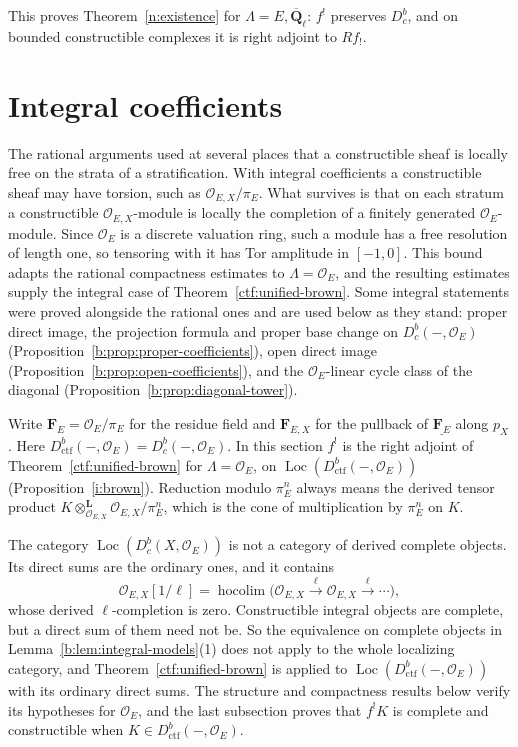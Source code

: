 \documentclass[11pt,a4paper]{article}
\numberwithin{equation}{section}
\theoremstyle{definition}
\theoremstyle{remark}
\newcommand{\Dbc}{D^b_c}
\newcommand{\Loc}{\operatorname{Loc}}
\newcommand{\Qbar}{\overline{\mathbf Q}_\ell}
\newcommand{\Dctf}{D^b_{\mathrm{ctf}}}
\begin{document}
This proves Theorem~\ref{n:existence} for $\Lambda=E,\Qbar$: $f^!$
preserves $\Dbc$, and on bounded constructible complexes it is right
adjoint to $Rf_!$.

\section{Integral coefficients}
\label{i:heart}
The rational arguments used at several places that a constructible sheaf
is locally free on the strata of a stratification. With integral
coefficients a constructible sheaf may have torsion, such as
$\mathcal O_{E,X}/\pi_E$. What survives is that on each stratum a
constructible $\mathcal O_{E,X}$-module is locally the completion of a
finitely generated $\mathcal O_E$-module. Since $\mathcal O_E$ is a
discrete valuation ring, such a module has a free resolution of length
one, so tensoring with it has Tor amplitude in $[-1,0]$. This bound
adapts the rational compactness estimates to $\Lambda=\mathcal O_E$,
and the resulting estimates supply the integral case of
Theorem~\ref{ctf:unified-brown}. Some integral statements were proved
alongside the rational ones and are used below as they stand: proper direct image,
the projection formula and proper base change on $\Dbc(-,\mathcal O_E)$
(Proposition~\ref{b:prop:proper-coefficients}), open direct image
(Proposition~\ref{b:prop:open-coefficients}), and the $\mathcal O_E$-linear
cycle class of the diagonal (Proposition~\ref{b:prop:diagonal-tower}).

Write $\mathbf F_E=\mathcal O_E/\pi_E$ for the residue field and
$\mathbf F_{E,X}$ for the pullback of $\underline{\mathbf F_E}$ along
$p_X$. Here
$\Dctf(-,\mathcal O_E)=\Dbc(-,\mathcal O_E)$.
In this section $f^!$ is the right adjoint of
Theorem~\ref{ctf:unified-brown} for $\Lambda=\mathcal O_E$, on
$\Loc(\Dctf(-,\mathcal O_E))$ (Proposition~\ref{i:brown}). Reduction
modulo $\pi_E^n$ always means the derived tensor product
$K\otimes^{\mathbf L}_{\mathcal O_{E,X}}\mathcal O_{E,X}/\pi_E^n$, which is
the cone of multiplication by $\pi_E^n$ on $K$.

The category $\Loc(\Dbc(X,\mathcal O_E))$ is not a category of derived
complete objects. Its direct sums are the ordinary ones, and it contains
\[
 \mathcal O_{E,X}[1/\ell]
 =\operatorname{hocolim}\bigl(\mathcal O_{E,X}
   \xrightarrow{\ell}\mathcal O_{E,X}
   \xrightarrow{\ell}\cdots\bigr),
\]
whose derived $\ell$-completion is zero. Constructible integral objects
are complete, but a direct sum of them need not be. So the equivalence
on complete objects in Lemma~\ref{b:lem:integral-models}(1) does not
apply to the whole localizing category, and
Theorem~\ref{ctf:unified-brown} is applied to
$\Loc(\Dctf(-,\mathcal O_E))$ with its ordinary direct sums. The
structure and compactness results below verify its hypotheses for
$\mathcal O_E$, and the last subsection proves that
$f^!K$ is complete and constructible when
$K\in\Dctf(-,\mathcal O_E)$.
\end{document}
